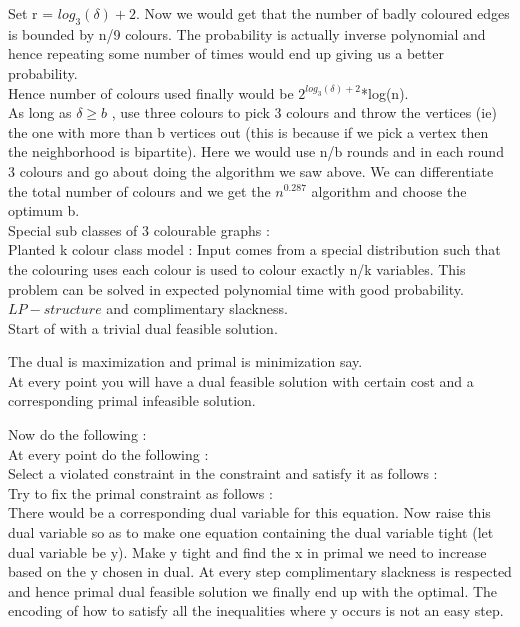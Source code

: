\documentclass[solution,addpoints,12pt]{exam}
\begin{document}
Set r = $log_3(\delta) + 2$. Now we would get that
the number of badly coloured edges is bounded by n/9 colours.
The probability is actually inverse polynomial and hence repeating
some number of times would end up giving us a better probability.\\
Hence number of colours used finally would be
$2^{log_3(\delta) + 2}$*log(n).\\
As long as $\delta \ge b$ , use three colours to
pick 3 colours and throw the vertices (ie) the one with
more than b vertices out (this is because
if we pick a vertex then the neighborhood is bipartite). Here we would use n/b
rounds and in each round 3 colours and go about doing the algorithm we
saw above. We can differentiate the total number of colours and we get
the $n^{0.287}$ algorithm and choose the optimum b.\\

Special sub classes of 3 colourable graphs :\\
Planted k colour class model : Input comes
from a special distribution such that the colouring
uses each colour is used to colour exactly n/k variables.
This problem can be solved in expected polynomial
time with good probability.\\

$LP-structure$ and complimentary slackness.\\
Start of with a trivial dual feasible solution.

The dual is maximization and primal is minimization say.\\
At every point you will have a dual feasible solution
with certain cost and a corresponding primal infeasible solution.

Now do the following :\\
At every point do the following :\\
Select a violated constraint in the constraint and satisfy it
as follows :\\
Try to fix the primal constraint as follows :\\
There would be a corresponding dual variable for this
equation. Now raise this dual variable so as to make
one equation containing the dual variable tight (let dual variable
be y). Make y tight and find the x in primal we need to
increase based on the y chosen in dual. At every step
complimentary slackness is respected and hence primal
dual feasible solution we finally end up with the optimal. The
encoding of how to satisfy all the inequalities where y occurs
is not an easy step.\\
\end{document}
